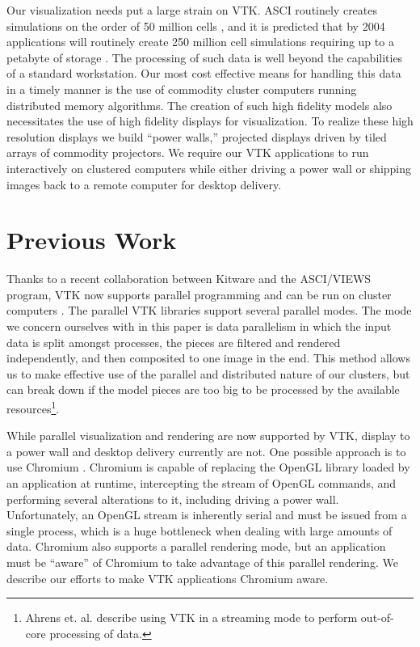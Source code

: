\documentclass[twocolumn]{article}
\begin{document}
  Our visualization needs put a large strain on VTK.  ASCI routinely
  creates simulations on the order of 50 million cells \cite{Heermann99},
  and it is predicted that by 2004 applications will routinely create 250
  million cell simulations requiring up to a petabyte of storage
  \cite{Smith98}.  The processing of such data is well beyond the
  capabilities of a standard workstation.  Our most cost effective means
  for handling this data in a timely manner is the use of commodity cluster
  computers running distributed memory algorithms.  The creation of such
  high fidelity models also necessitates the use of high fidelity displays
  for visualization.  To realize these high resolution displays we build
  ``power walls,'' projected displays driven by tiled arrays of commodity
  projectors.  We require our VTK applications to run interactively on
  clustered computers while either driving a power wall or shipping images
  back to a remote computer for desktop delivery.


  \section{Previous Work}
  \label{sec:previous_work}

  Thanks to a recent collaboration between Kitware and the ASCI/VIEWS
  program, VTK now supports parallel programming and can be run on cluster
  computers \cite{Ahrens00}.  The parallel VTK libraries support several
  parallel modes.  The mode we concern ourselves with in this paper is data
  parallelism in which the input data is split amongst processes, the
  pieces are filtered and rendered independently, and then composited to
  one image in the end.  This method allows us to make effective use of the
  parallel and distributed nature of our clusters, but can break down if
  the model pieces are too big to be processed by the available
  resources\footnote{Ahrens et. al. \cite{Ahrens01} describe using VTK in a
  streaming mode to perform out-of-core processing of data.}.

  While parallel visualization and rendering are now supported by VTK,
  display to a power wall and desktop delivery currently are not.  One
  possible approach is to use Chromium \cite{Humphreys02}.  Chromium is
  capable of replacing the OpenGL library loaded by an application at
  runtime, intercepting the stream of OpenGL commands, and performing
  several alterations to it, including driving a power wall.
  Unfortunately, an OpenGL stream is inherently serial and must be issued
  from a single process, which is a huge bottleneck when dealing with large
  amounts of data.  Chromium also supports a parallel rendering mode, but
  an application must be ``aware'' of Chromium to take advantage of this
  parallel rendering.  We describe our efforts to make VTK applications
  Chromium aware.
\end{document}
